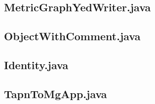\documentclass{../TechDoc}
\begin{document}
	\subsection{MetricGraphYedWriter.java}
	
	\subsection{ObjectWithComment.java}
	
	\subsection{Identity.java}
	
	\subsection{TapnToMgApp.java}
	
	\registrationList
\end{document}
